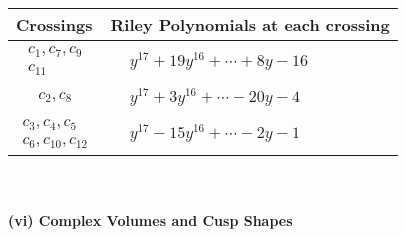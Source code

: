 \documentclass[1p]{elsarticle_modified}
\theoremstyle{definition}
\begin{document}
\begin{tabular}{m{50pt}|m{274pt}}
Crossings & \hspace{64pt}Riley Polynomials at each crossing \\
\hline $$\begin{aligned}c_{1},c_{7},c_{9}\\c_{11}\end{aligned}$$&$\begin{aligned}
&y^{17}+19 y^{16}+\cdots+8 y-16
\end{aligned}$\\
\hline $$\begin{aligned}c_{2},c_{8}\end{aligned}$$&$\begin{aligned}
&y^{17}+3 y^{16}+\cdots-20 y-4
\end{aligned}$\\
\hline $$\begin{aligned}c_{3},c_{4},c_{5}\\c_{6},c_{10},c_{12}\end{aligned}$$&$\begin{aligned}
&y^{17}-15 y^{16}+\cdots-2 y-1
\end{aligned}$\\
\hline
\end{tabular}\\~\\
\newpage\flushleft \textbf{(vi) Complex Volumes and Cusp Shapes}
\end{document}
